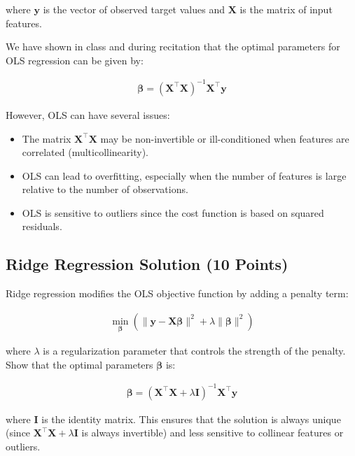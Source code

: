 \documentclass{article}
\begin{document}
where $\mathbf{y}$ is the vector of observed target values and $\mathbf{X}$ is the matrix of input features.

We have shown in class and during recitation that the optimal parameters for OLS regression can be given by:

\begin{align}
\boldsymbol{\beta} = (\mathbf{X}^\top \mathbf{X})^{-1} \mathbf{X}^\top \mathbf{y}
\end{align}

However, OLS can have several issues:
\begin{itemize}
    \item The matrix $\mathbf{X}^\top \mathbf{X}$ may be non-invertible or ill-conditioned when features are correlated (multicollinearity).
    \item OLS can lead to overfitting, especially when the number of features is large relative to the number of observations.
    \item OLS is sensitive to outliers since the cost function is based on squared residuals.
\end{itemize}

\subsection{Ridge Regression Solution (10 Points)}
Ridge regression modifies the OLS objective function by adding a penalty term:

\begin{align}
\min_{\boldsymbol{\beta}} \left( \|\mathbf{y} - \mathbf{X} \boldsymbol{\beta}\|^2 + \lambda \|\boldsymbol{\beta}\|^2 \right)
\end{align}

where $\lambda$ is a regularization parameter that controls the strength of the penalty. Show that the optimal parameters $\boldsymbol{\beta}$ is:

\begin{align}
\boldsymbol{\beta} = (\mathbf{X}^\top \mathbf{X} + \lambda \mathbf{I})^{-1} \mathbf{X}^\top \mathbf{y}
\end{align}

where $\mathbf{I}$ is the identity matrix. This ensures that the solution is always unique (since $\mathbf{X}^\top \mathbf{X} + \lambda \mathbf{I}$ is always invertible) and less sensitive to collinear features or outliers.
\end{document}
